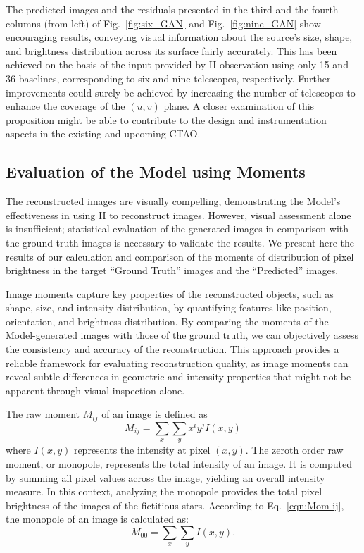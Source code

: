 The predicted images and the residuals presented in the third and the fourth columns (from left) of Fig.~\ref{fig:six_GAN} and Fig.~\ref{fig:nine_GAN} show encouraging results, conveying visual information about the source's size, shape, and brightness distribution across its surface fairly accurately. This has been achieved on the basis of the input provided by II observation using only 15 and 36 baselines, corresponding to six and nine telescopes, respectively.  Further improvements could surely be achieved by increasing the number of telescopes to enhance the coverage of the $(u, v)$ plane. A closer examination of this proposition might be able to contribute to the design and instrumentation aspects in the existing and upcoming CTAO.

\subsection{Evaluation of the Model using Moments}
The reconstructed images are visually compelling, demonstrating the Model's effectiveness in using II to reconstruct images. However, visual assessment alone is insufficient; statistical evaluation of the generated images in comparison with the ground truth images is necessary to validate the results. We present here the results of our calculation and comparison of the moments of distribution of pixel brightness in the target ``Ground Truth'' images and the ``Predicted'' images.

Image moments capture key properties of the reconstructed objects, such as shape, size, and intensity distribution, by quantifying features like position, orientation, and brightness distribution. By comparing the moments of the Model-generated images with those of the ground truth, we can objectively assess the consistency and accuracy of the reconstruction. This approach provides a reliable framework for evaluating reconstruction quality, as image moments can reveal subtle differences in geometric and intensity properties that might not be apparent through visual inspection alone.

The raw moment $M_{ij}$ of an image is defined as \citep{hu1962visual}
\begin{equation}
	M_{ij} = \sum_{x} \sum_{y} x^i y^j I(x, y)
	\label{eqn:Mom-ij}
\end{equation}
where $I(x,y)$ represents the intensity at pixel $(x,y)$. The zeroth order raw moment, or monopole, represents the total intensity of an image. It is computed by summing all pixel values across the image, yielding an overall intensity measure. In this context, analyzing the monopole provides the total pixel brightness of the images of the fictitious stars. According to Eq.~\eqref{eqn:Mom-ij}, the monopole of an image is calculated as:
\begin{equation}
	M_{00} = \sum_{x} \sum_{y} I(x, y).
	\label{eqn:Mom-00}
\end{equation}

